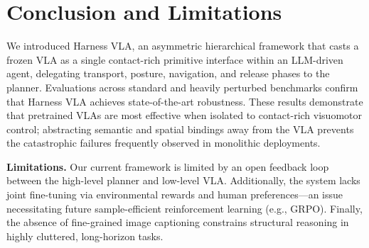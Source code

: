 \documentclass{article}
\begin{document}
\section{Conclusion and Limitations}
\label{sec:conclusion}

We introduced Harness VLA, an asymmetric hierarchical framework that casts a frozen VLA as a single contact-rich primitive interface within an LLM-driven agent, delegating transport, posture, navigation, and release phases to the planner. Evaluations across standard and heavily perturbed benchmarks confirm that Harness VLA achieves state-of-the-art robustness. These results demonstrate that pretrained VLAs are most effective when isolated to contact-rich visuomotor control; abstracting semantic and spatial bindings away from the VLA prevents the catastrophic failures frequently observed in monolithic deployments.

\textbf{Limitations.} Our current framework is limited by an open feedback loop between the high-level planner and low-level VLA. Additionally, the system lacks joint fine-tuning via environmental rewards and human preferences---an issue necessitating future sample-efficient reinforcement learning (e.g., GRPO). Finally, the absence of fine-grained image captioning constrains structural reasoning in highly cluttered, long-horizon tasks.


\clearpage




\appendix

\end{document}
